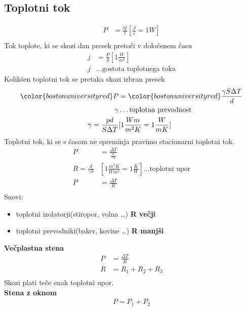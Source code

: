 {\color{indiagreen}\subsection{Toplotni tok}}
\begin{align*}
	P &= \frac{Q}{t}[\frac{J}{s}=1W]\\
\end{align*}
Tok toplote, ki se skozi dan presek pretoči v določenem času\\
\begin{align*}
	j &= \frac{P}{S}[1\frac{W}{m^2}]\\
	j &\dots \text{gostota toplotnega toka}
\end{align*}
Kolikšen toplotni tok se pretaka skozi izbran presek\\
\begin{align*}
	{\color{bostonuniversityred}P} &= {\color{bostonuniversityred}\frac{\gamma S \Delta T}{d}}\\
	\gamma &\dots \text{toplotna prevodnost}\\
	\gamma = \frac{pd}{S \Delta T}&[1 \frac{Wm}{m^2 K} = 1 \frac{W}{mK}]\\
\end{align*}
Toplotni tok, ki se s časom ne spreminja pravimo stacionarni toplotni tok.\\
\begin{align*}
	P &= \frac{\Delta T}{\frac{d}{\gamma S}}\\
	R = \frac{d}{\gamma S}&[1\frac{m^2K}{Wm^2} = 1\frac{K}{W}]\dots \text{toplotni upor}\\	
	P &= \frac{\Delta T}{R}\\
\end{align*}
Snovi:
\begin{itemize}
	\item toplotni izolatorji(stiropor, volna \dots) \textbf{R večji}
	\item toplotni prevodniki(baker, kovine \dots) \textbf{R manjši}
\end{itemize}
\textbf{Večplastna stena}\\
\begin{align*}
	P &= \frac{\Delta T}{R}\\
	R &= R_1 + R_2 + R_3\\
\end{align*}
Skozi plati teče enak toplotni upor.\\
\textbf{Stena z oknom}\\
\begin{align*}
	P = P_1 + P_2\\
\end{align*}


